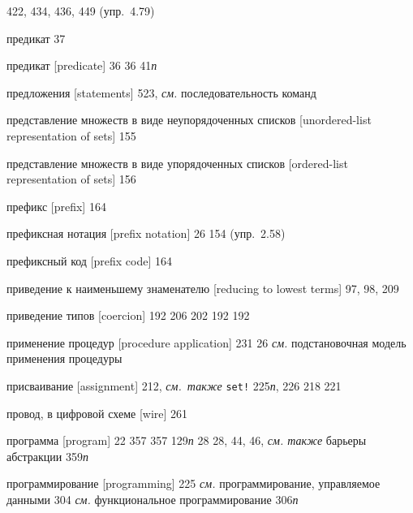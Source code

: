 \begin{theindex}
   422, 434, 436, 449 (упр.~4.79)
\item {пре\-ди\-кат}
   37
\item {предикат [predicate]} 36
   36
   41{\it п}
\item {предложения [statements]} 523, {\it см.} последовательность команд
\item {представление множеств в виде неупорядоченных списков [unordered-list repre\-sen\-ta\-tion of sets]} 155
\item {представление множеств в виде упорядоченных списков [ordered-list repre\-sen\-ta\-tion of sets]} 156
\item {префикс [prefix]} 164
\item {префиксная нотация [prefix notation]} 26
   154 (упр.~2.58)
\item {префиксный код [prefix code]} 164
\item {приведение к наименьшему знаменателю [reducing to lowest terms]} 97, 98, 209
\item {приведение типов [coercion]} 192
   206
   202
   192
   192
\item {применение процедур [procedure application]}
   231
   26
   {\it см.} подстановочная модель применения процедуры
\item {присваивание [assignment]} 212, {\it см.~также} {\tt set!}
   225{\it п}, 226
   218
   221
\item {провод, в цифровой схеме [wire]} 261
\item {программа [program]} 22
   357
   357
   129{\it п}
   28
   28, 44, 46, {\it см. также} барьеры абстракции
   359{\it п}
\item {программирование [programming]}
   225
   {\it см.} программирование, управляемое данными
   304
   {\it см.} функциональное программирование
   306{\it п}

\end{theindex}

